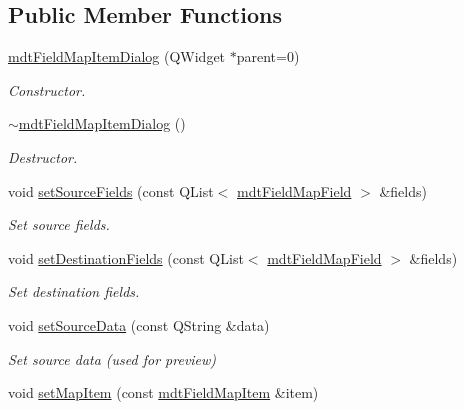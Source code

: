 \subsection*{Public Member Functions}
\begin{DoxyCompactItemize}
\item 
\hypertarget{classmdt_field_map_item_dialog_ac745bae9c7ce26f72aa081bc54ac5f22}{
\hyperlink{classmdt_field_map_item_dialog_ac745bae9c7ce26f72aa081bc54ac5f22}{mdtFieldMapItemDialog} (QWidget $\ast$parent=0)}
\label{classmdt_field_map_item_dialog_ac745bae9c7ce26f72aa081bc54ac5f22}

\begin{DoxyCompactList}\small\item\em Constructor. \end{DoxyCompactList}\item 
\hypertarget{classmdt_field_map_item_dialog_a12f195eeceb6729557a9e05835b7ca3f}{
\hyperlink{classmdt_field_map_item_dialog_a12f195eeceb6729557a9e05835b7ca3f}{$\sim$mdtFieldMapItemDialog} ()}
\label{classmdt_field_map_item_dialog_a12f195eeceb6729557a9e05835b7ca3f}

\begin{DoxyCompactList}\small\item\em Destructor. \end{DoxyCompactList}\item 
void \hyperlink{classmdt_field_map_item_dialog_a97e6808b1c3b3bb5748a0fcc98a439c9}{setSourceFields} (const QList$<$ \hyperlink{classmdt_field_map_field}{mdtFieldMapField} $>$ \&fields)
\begin{DoxyCompactList}\small\item\em Set source fields. \end{DoxyCompactList}\item 
void \hyperlink{classmdt_field_map_item_dialog_a0fe47b3b9634d292936dfe4e0a4df36e}{setDestinationFields} (const QList$<$ \hyperlink{classmdt_field_map_field}{mdtFieldMapField} $>$ \&fields)
\begin{DoxyCompactList}\small\item\em Set destination fields. \end{DoxyCompactList}\item 
\hypertarget{classmdt_field_map_item_dialog_a0e047487ba8b45d2e1ef8bfb9f78c8a6}{
void \hyperlink{classmdt_field_map_item_dialog_a0e047487ba8b45d2e1ef8bfb9f78c8a6}{setSourceData} (const QString \&data)}
\label{classmdt_field_map_item_dialog_a0e047487ba8b45d2e1ef8bfb9f78c8a6}

\begin{DoxyCompactList}\small\item\em Set source data (used for preview) \end{DoxyCompactList}\item 
\hypertarget{classmdt_field_map_item_dialog_a9f0ff77de969dade822684f63ed52595}{
void \hyperlink{classmdt_field_map_item_dialog_a9f0ff77de969dade822684f63ed52595}{setMapItem} (const \hyperlink{classmdt_field_map_item}{mdtFieldMapItem} \&item)}
\label{classmdt_field_map_item_dialog_a9f0ff77de969dade822684f63ed52595}


\end{DoxyCompactItemize}
